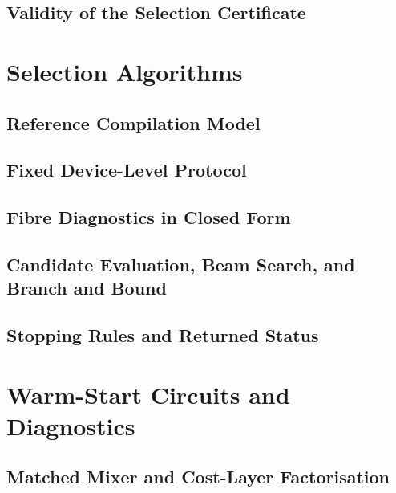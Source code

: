 \documentclass[journal,onecolumn,11pt]{IEEEtran}
\theoremstyle{plain}
\begin{document}
\subsection{Validity of the Selection Certificate}
\label{sup:proofs:certificate}

\section{Selection Algorithms}
\label{sup:algorithms}

\subsection{Reference Compilation Model}
\label{sup:algorithms:reference}

\subsection{Fixed Device-Level Protocol}
\label{sup:algorithms:device}

\subsection{Fibre Diagnostics in Closed Form}
\label{sup:algorithms:fibre}

\subsection{Candidate Evaluation, Beam Search, and Branch and Bound}
\label{sup:algorithms:search}


\subsection{Stopping Rules and Returned Status}
\label{sup:algorithms:status}

\section{Warm-Start Circuits and Diagnostics}
\label{sup:warmstart}

\subsection{Matched Mixer and Cost-Layer Factorisation}
\label{sup:warmstart:circuits}
\end{document}
